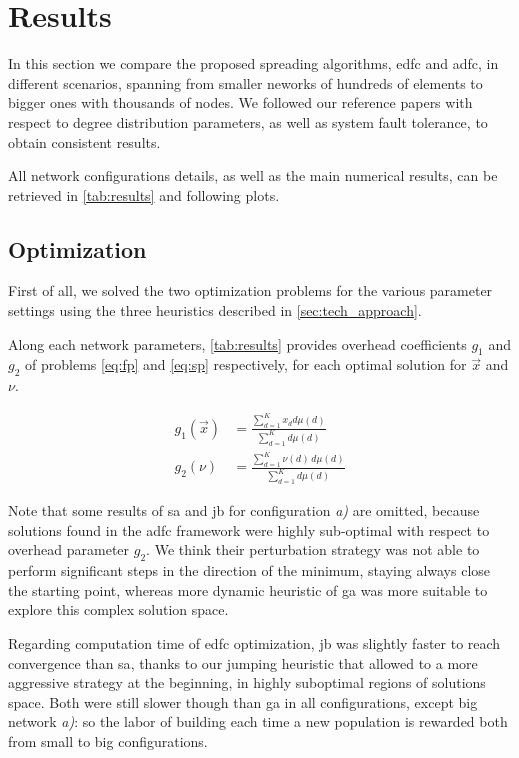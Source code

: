 \documentclass[12pt,journal,draftclsnofoot,onecolumn]{IEEEtran}
\begin{document}
\clearpage
\section{Results} \label{sec:results}
In this section we compare the proposed spreading algorithms, \gls{edfc} and \gls{adfc}, in different scenarios, spanning from smaller neworks of hundreds of elements to bigger ones with thousands of nodes.
We followed our reference papers \cite{Lin2007} \cite{Aly2008} with respect to degree distribution parameters, as well as system fault tolerance, to obtain consistent results.

All network configurations details, as well as the main numerical results, can be retrieved in \autoref{tab:results} and following plots.

\subsection{Optimization}
First of all, we solved the two optimization problems for the various parameter settings using the three heuristics described in \autoref{sec:tech_approach}.

Along each network parameters, \autoref{tab:results} provides overhead coefficients $g_1$ and $g_2$ of problems \autoref{eq:fp} and \autoref{eq:sp} respectively, for each optimal solution for $\vec{x}$ and $\nu$.\cite{Lin2007}

\begin{equation*}
	\begin{split}
		g_1(\vec{x}) &= \frac{\sum_{d=1}^K x_d d \mu (d)}{\sum_{d=1}^K d \mu (d)} \\
		g_2(\nu) &= \frac{\sum_{d=1}^K \nu(d) \, d \mu (d)}{\sum_{d=1}^K d \mu (d)}
	\end{split}
\end{equation*} \vspace{0cm}

Note that some results of \gls{sa} and \gls{jb} for configuration \emph{a)} are omitted, because solutions found in the \gls{adfc} framework were highly sub-optimal with respect to overhead parameter $g_2$.
We think their perturbation strategy was not able to perform significant steps in the direction of the minimum, staying always close the starting point, whereas more dynamic heuristic of \gls{ga} was more suitable to explore this complex solution space.

\smallbreak
Regarding computation time of \gls{edfc} optimization, \gls{jb} was slightly faster to reach convergence than \gls{sa}, thanks to our jumping heuristic that allowed to a more aggressive strategy at the beginning, in highly suboptimal regions of solutions space.
Both were still slower though than \gls{ga} in all configurations, except big network \emph{a)}: so the labor of building each time a new population is rewarded both from small to big configurations.
\end{document}
